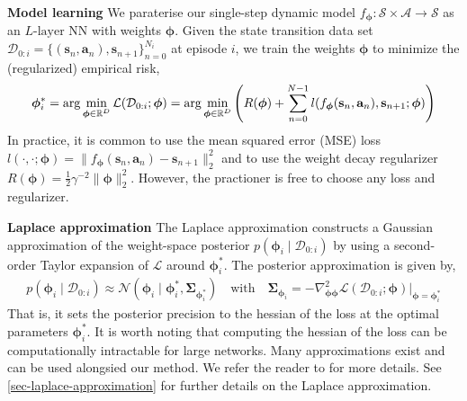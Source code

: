 \documentclass{article}
\newcommand{\state}{\ensuremath{\mathbf{s}}}
\newcommand{\action}{\ensuremath{\mathbf{a}}}
\newcommand{\dataset}{\ensuremath{\mathcal{D}}}
\newcommand{\stateDomain}{\ensuremath{\mathcal{S}}}
\newcommand{\actionDomain}{\ensuremath{\mathcal{A}}}
\newcommand{\transitionFn}{\ensuremath{f}}
\newcommand{\transitionParams}{\ensuremath{\bm\phi}}
\newcommand{\transitionFnWithParams}{\ensuremath{\transitionFn_{\transitionParams}}}
\begin{document}
\textbf{Model learning}
We paraterise our single-step dynamic model $\transitionFnWithParams : \stateDomain \times \actionDomain \rightarrow \stateDomain$
as an $L\text{-layer}$ NN with weights $\transitionParams$.
Given the state transition data set $\dataset_{0:i} = \{(\state_{n}, \action_{n}), \state_{n+1}\}_{n=0}^{N_{i}}$ at episode $i$,
we train the weights $\transitionParams$ to minimize the (regularized) empirical risk,
\begin{align}
  \transitionParams^{*}_{i} = \arg \min_{\transitionParams \in \R^{D}} \mathcal{L}(\dataset_{0:i};\transitionParams) = \arg \min_{\transitionParams \in \R^{D}} \left(
  R(\transitionParams) + \sum_{n=0}^{N-1} l(\transitionFnWithParams(\state_{n}, \action_{n}), \state_{n+1}; \transitionParams) \right)
\end{align}
In practice, it is common to use the mean squared error (MSE) loss
$l(\cdot,\cdot;\transitionParams) = \|\transitionFnWithParams(\state_{n}, \action_{n}) - \state_{n+1} \|^{2}_{2}$
and to use the weight decay regularizer $R(\transitionParams)=\frac{1}{2}\gamma^{-2}\|\transitionParams\|^{2}_{2}$.
However, the practioner is free to choose any loss and regularizer. 

\textbf{Laplace approximation}
The Laplace approximation  constructs a Gaussian approximation of the weight-space posterior $p(\transitionParams_{i} \mid \dataset_{0:i})$
by using a second-order Taylor expansion of $\mathcal{L}$ around $\transitionParams^{*}_{i}$.
The posterior approximation is given by,
\begin{align} \label{eq-laplace-approx-weight-space}
  p(\transitionParams_{i} \mid \dataset_{0:i}) \approx \mathcal{N} \left( \transitionParams_{i} \mid \transitionParams^{*}_{i} , \bm\Sigma_{\transitionParams^{*}_{i}} \right)
  \quad \text{with} \quad \bm\Sigma_{\transitionParams_{i}} =
 - \nabla_{\transitionParams \transitionParams}^{2} \mathcal{L} ( \dataset_{0:i} ; \transitionParams)|_{\transitionParams=\transitionParams^{*}_{i}}
\end{align}
That is, it sets the posterior precision to the hessian of the loss at the optimal parameters $\transitionParams^{*}_{i}$.
It is worth noting that computing the hessian of the loss can be computationally intractable for large networks.
Many approximations exist and can be used alongsied our method. We refer the reader to \cite{daxbergerLaplace2021} for more details.
See \cref{sec-laplace-approximation} for further details on the Laplace approximation.
\end{document}
